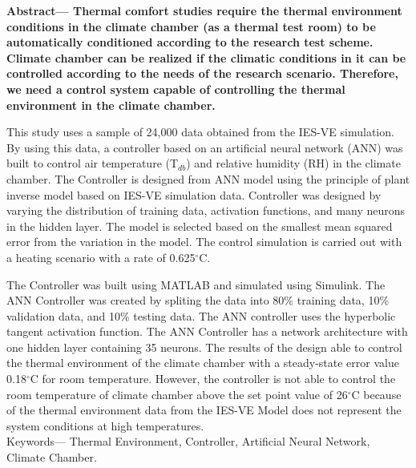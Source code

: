 \documentclass[a4paper,10pt]{article}
\begin{document}
	{\setlength{\parindent}{0cm}\bfseries
		Abstract--- Thermal comfort studies require the thermal environment conditions in the climate chamber (as a thermal test room) to be automatically conditioned according to the research test scheme. Climate chamber can be realized if the climatic conditions in it can be controlled according to the needs of the research scenario. Therefore, we need a control system capable of controlling the thermal environment in the climate chamber.
		
		\qquad This study uses a sample of 24,000 data obtained from the IES-VE simulation. By using this data, a controller based on an artificial neural network (ANN) was built to control air temperature (T$_{db}$) and relative humidity (RH) in the climate chamber. The Controller is designed from ANN model using the principle of plant inverse model based on IES-VE simulation data. Controller was designed by varying the distribution of training data, activation functions, and many neurons in the hidden layer. The model is selected based on the smallest mean squared error from the variation in the model. The control simulation is carried out with a heating scenario with a rate of 0.625$^\circ$C.
		
		\qquad The Controller was built using MATLAB and simulated using Simulink. The ANN Controller was created by spliting the data into 80\% training data, 10\% validation data, and 10\% testing data. The ANN controller uses the hyperbolic tangent activation function. The ANN Controller has a network architecture with one hidden layer containing 35 neurons. The results of the design able to control the thermal environment of the climate chamber with a steady-state error value 0.18$^\circ$C for room temperature. However, the controller is not able to control the room temperature of climate chamber above the set point value of 26$^\circ$C because of the thermal environment data from the IES-VE Model does not represent the system conditions at high temperatures.\\
		
		Keywords--- Thermal Environment, Controller, Artificial Neural Network, Climate Chamber.
	}

	\vspace{2cm}
	
\end{document}

